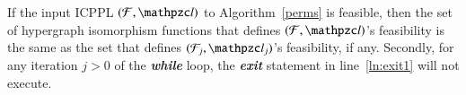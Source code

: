 \documentclass[MS,]{iitmdiss}
\begin{document}

\begin{lemma}
  \label{lem:noexit1}
  If the input ICPPL $(\cF, \cl)$ to Algorithm~\ref{perms} is
  feasible, then the set of hypergraph isomorphism functions that
  defines $(\cF, \cl)$'s feasibility is the same as the set that
  defines $(\cF_j, \cl_j)$'s feasibility, if any.  Secondly, for any
  iteration $j > 0$ of the {\em \bf while} loop, the {\em \bf exit}
  statement in line~\ref{ln:exit1} will not execute.
\end{lemma}
\end{document}
